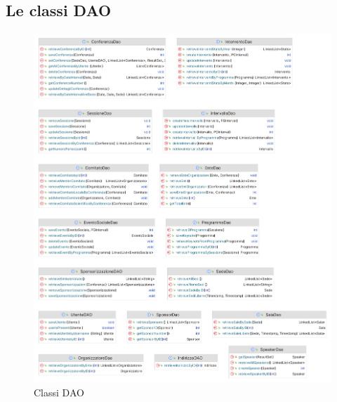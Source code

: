 \subsection{Le classi DAO}
\begin{figure}[h!]
	\includegraphics[scale=0.2]{Immagini/ClassiDAO.png}
	\caption{Classi DAO}
\end{figure}